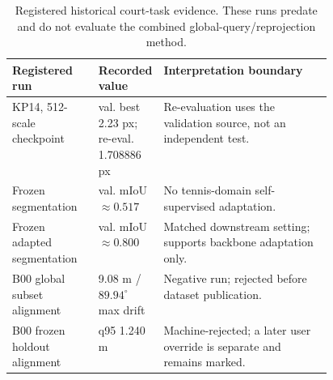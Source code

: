 \begin{table}[t]
  \centering
  \caption{Registered historical court-task evidence.  These runs predate and
  do not evaluate the combined global-query/reprojection method.}
  \label{tab:registered_evidence}
  \small
  \begin{tabularx}{\linewidth}{@{}p{0.27\linewidth}p{0.19\linewidth}X@{}}
    \toprule
    Registered run & Recorded value & Interpretation boundary \\
    \midrule
    KP14, 512-scale checkpoint & val. best 2.23 px; re-eval. 1.708886 px &
      Re-evaluation uses the validation source, not an independent test. \\
    Frozen \DINO{} segmentation & val. mIoU $\approx0.517$ &
      No tennis-domain self-supervised adaptation. \\
    Frozen adapted \DINO{} segmentation & val. mIoU $\approx0.800$ &
      Matched downstream setting; supports backbone adaptation only. \\
    B00 global subset alignment & 9.08 m / $89.94^\circ$ max drift &
      Negative run; rejected before dataset publication. \\
    B00 frozen holdout alignment & q95 1.240 m &
      Machine-rejected; a later user override is separate and remains marked. \\
    \bottomrule
  \end{tabularx}
\end{table}
